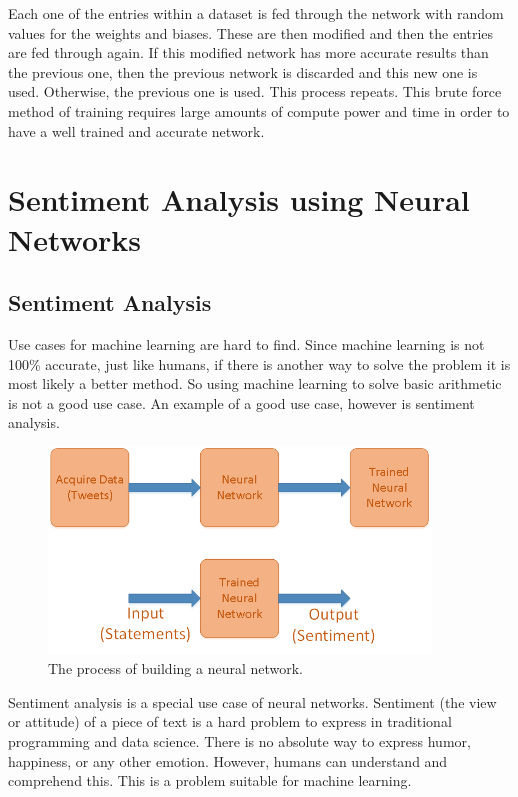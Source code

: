 \documentclass[12pt]{article}
\begin{document}
    Each one of the entries within a dataset is fed through the network with random values for the weights and biases. These are then modified and then the entries are fed through again. If this modified network has more accurate results than the previous one, then the previous network is discarded and this new one is used. Otherwise, the previous one is used. This process repeats. This brute force method of training requires large amounts of compute power and time in order to have a well trained and accurate network.

    \section{Sentiment Analysis using Neural Networks}
    \subsection{Sentiment Analysis}
    Use cases for machine learning are hard to find. Since machine learning is not 100\% accurate, just like humans, if there is another way to solve the problem it is most likely a better method\autocite{pitfallsML}. So using machine learning to solve basic arithmetic is not a good use case. An example of a good use case, however is sentiment analysis.

    \begin{figure}
        \begin{center}
            \includegraphics[width=4in]{Process.png}
        \end{center}
        \caption{The process of building a neural network.}
        \label{fig:NNProcess}
    \end{figure}

    Sentiment analysis is a special use case of neural networks. Sentiment (the view or attitude) of a piece of text is a hard problem to express in traditional programming and data science. There is no absolute way to express humor, happiness, or any other emotion. However, humans can understand and comprehend this. This is a problem suitable for machine learning.
\end{document}
